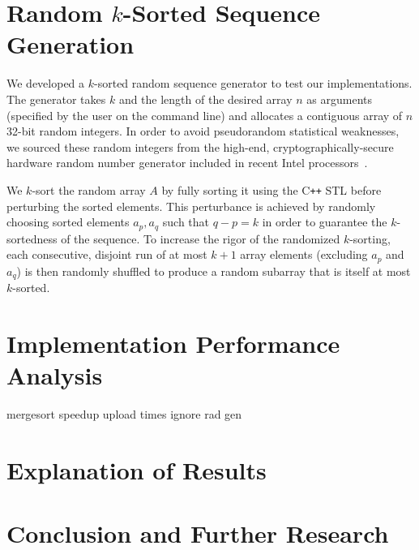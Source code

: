 \documentclass[letterpaper, 12pt]{article}
\let\supercite\cite
\renewcommand{\cite}[1]{\textnormal{~\supercite{#1}}}
\begin{document}
\section{Random $k$-Sorted Sequence Generation}
We developed a $k$-sorted random sequence generator to test our implementations.
The generator takes $k$ and the length of the desired array $n$ as arguments (specified by the user on the command line) and
  allocates a contiguous array of $n$ 32-bit random integers.
In order to avoid pseudorandom statistical weaknesses, we sourced these random integers from the high-end,
   cryptographically-secure hardware random number generator included in recent Intel processors\cite{intel12}.

We $k$-sort the random array $A$ by fully sorting it using the C\texttt{++} STL before perturbing the sorted elements.
This perturbance is achieved by randomly choosing sorted elements $a_p, a_q$ such that $q - p = k$ in order to guarantee the
  $k$-sortedness of the sequence.
To increase the rigor of the randomized $k$-sorting, each consecutive, disjoint run of at most $k + 1$ array elements
  (excluding $a_p$ and $a_q$) is then randomly shuffled to produce a random subarray that is itself at most $k$-sorted.

\section{Implementation Performance Analysis}
mergesort speedup
upload times
ignore rad gen

\begin{sidewaysfigure}

\vspace{-4ex}
\caption{\label{fig:k2}{\em
  Sort Runtimes over Arrays of Length $n\cdot 10^6$, $k = 2$
}}
\end{sidewaysfigure}

\begin{sidewaysfigure}

\vspace{-4ex}
\caption{\label{fig:k15}{\em
  Sort Runtimes over Arrays of Length $n\cdot 10^6$, $k = 15$
}}
\end{sidewaysfigure}

\begin{sidewaysfigure}

\vspace{-4ex}
\caption{\label{fig:n750k}{\em
  Sort Runtimes over Arrays of Radius $k$, $n = 0.75\cdot 10^6$
}}
\end{sidewaysfigure}

\begin{sidewaysfigure}

\vspace{-4ex}
\caption{\label{fig:n1250k}{\em
  Sort Runtimes over Arrays of Radius $k$, $n = 1.25\cdot 10^6$
}}
\end{sidewaysfigure}

\clearpage
\section{Explanation of Results}

\section{Conclusion and Further Research}

\clearpage

\nocite{*}
\end{document}
